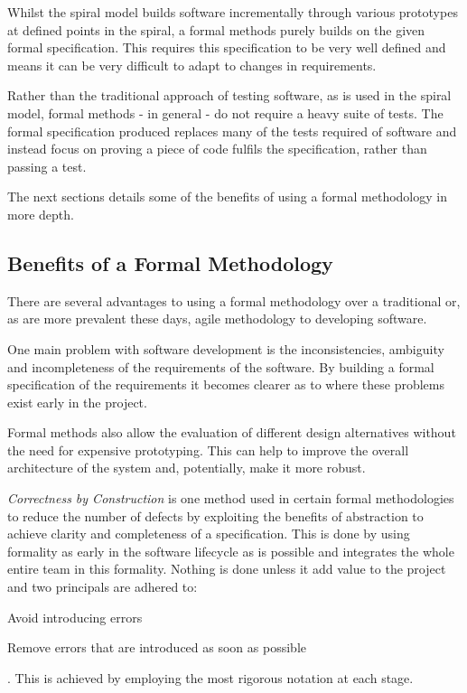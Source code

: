 \documentclass[a4paper, notitlepage, fleqn]{article}
\begin{document}
Whilst the spiral model builds software incrementally through various prototypes at defined points
in the spiral, a formal methods purely builds on the given formal specification. This requires 
this specification to be very well defined and means it can be very difficult to adapt to changes
in requirements.

Rather than the traditional approach of testing software, as is used in the spiral model, formal
methods - in general - do not require a heavy suite of tests. The formal specification produced
replaces many of the tests required of software and instead focus on proving a piece of code 
fulfils the specification, rather than passing a test.

The next sections details some of the benefits of using a formal methodology in more depth.


\subsection*{Benefits of a Formal Methodology}
There are several advantages to using a formal methodology over a traditional or, as are more
prevalent these days, agile methodology to developing software.

One main problem with software development is the inconsistencies, ambiguity and incompleteness of
the requirements of the software. By building a formal specification of the requirements it 
becomes clearer as to where these problems exist early in the project.

Formal methods also allow the evaluation of different design alternatives without the need for 
expensive prototyping. This can help to improve the overall architecture of the system and, 
potentially, make it more robust.

\emph{Correctness by Construction}\cite{Chapman:2006:CCM:1151816.1151820} is one method used in certain formal methodologies to
reduce the number of defects by exploiting the benefits of abstraction to achieve clarity and 
completeness of a specification. This is done by using formality as early in the software 
lifecycle as is possible and integrates the whole entire team in this formality. Nothing is done
unless it add value to the project and two principals are adhered to:
\begin{inparaenum}
\item Avoid introducing errors
\item Remove errors that are introduced as soon as possible
\end{inparaenum}\cite{Hall2005Formal}. This is achieved by employing the most rigorous notation 
at each stage.
\end{document}
